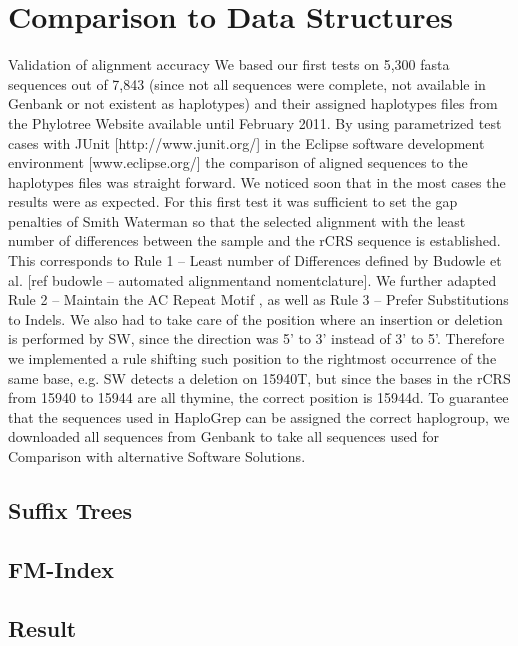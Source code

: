 \section{Comparison to Data Structures}
Validation of alignment accuracy
We based our first tests on 5,300 fasta sequences out of 7,843 (since not all sequences were complete, not available in Genbank or not existent as haplotypes) and their assigned haplotypes files from the Phylotree Website available until February 2011. By using parametrized test cases with JUnit [http://www.junit.org/] in the Eclipse software development environment [www.eclipse.org/] the comparison of aligned sequences to the haplotypes files was straight forward. We noticed soon that in the most cases the results were as expected. For this first test it was sufficient to set the gap penalties of Smith Waterman so that the selected alignment with the least number of differences between the sample and the rCRS sequence is established. This corresponds to Rule 1 – Least number of Differences defined by Budowle et al. [ref budowle – automated alignmentand nomentclature]. We further adapted Rule 2 – Maintain the AC Repeat Motif , as well as Rule 3 – Prefer Substitutions to Indels. We also had to take care of the position where an insertion or deletion is performed by SW, since the direction was 5’ to 3’ instead of 3’ to 5’. Therefore we implemented a rule shifting such position to the rightmost occurrence of the same base, e.g. SW detects a deletion on 15940T, but since the bases in the rCRS from 15940 to 15944 are all thymine, the correct position is 15944d. To guarantee that the sequences used in HaploGrep can be assigned the correct haplogroup, we downloaded all sequences from Genbank to take all sequences used for Comparison with alternative Software Solutions.
\subsection{Suffix Trees}
\subsection{FM-Index}
\subsection{Result}
